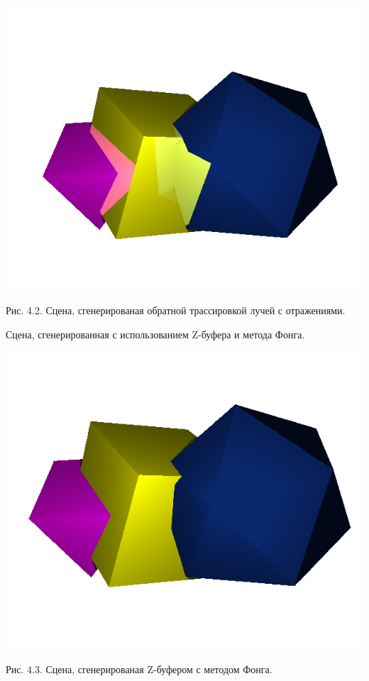 \documentclass[12pt]{report}
\begin{document}
	\begin{center}
		\includegraphics[scale=0.8]{rto.png}
		
		Рис. 4.2. Сцена, сгенерированая обратной трассировкой лучей с отражениями.
	\end{center}

	Сцена, сгенерированная с использованием Z-буфера и метода Фонга.

	\begin{center}
		\includegraphics[scale=0.8]{gph.png}
		
		Рис. 4.3. Сцена, сгенерированая Z-буфером с методом Фонга.
	\end{center}
\end{document}
